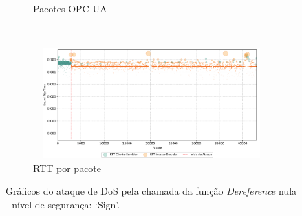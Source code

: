 \begin{apendicesenv}
\begin{figure}[htbp!]
\begin{subfigure}[t]{0.5\textwidth}
        \caption{Pacotes OPC UA}
    \end{subfigure}%
    ~
    \begin{subfigure}[t]{0.5\textwidth}
        \centering
        \includegraphics[width=1\textwidth, height=120pt]{USPSC-img/output/cropped/1-dos_function_call_null_deref-rttp.png}
        \caption{RTT por pacote}
    \end{subfigure}%
    \label{fig:1-dos_function_call_null_deref}
    \caption{Gráficos do ataque de DoS pela chamada da função \textit{Dereference} nula - nível de segurança: `Sign'.}
\end{figure}


\end{apendicesenv}
